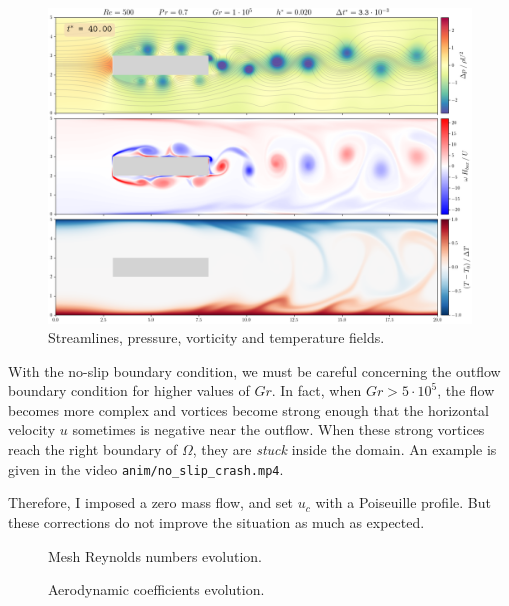 \documentclass[11 pt]{article}
\begin{document}
\begin{figure}[H]
    \centering
    \includegraphics[width=\textwidth]{../figures/frame_00400_no_slip.png}
    \caption{Streamlines, pressure, vorticity and temperature fields.}
    \label{fig:simu_no_slip}
\end{figure}

With the no-slip boundary condition, we must be careful concerning the outflow boundary condition for higher values of $Gr$. In fact, when $Gr > 5 \cdot 10^{5}$, the flow becomes more complex and vortices become strong enough that the horizontal velocity $u$ sometimes is negative near the outflow. When these strong vortices reach the right boundary of $\Omega$, they are \textit{stuck} inside the domain. An example is given in the video \texttt{anim/no\_slip\_crash.mp4}.

Therefore, I imposed a zero mass flow, and set $u_c$ with a Poiseuille profile. But these corrections do not improve the situation as much as expected.

\begin{figure}[H]
    \centering
    
    \caption{Mesh Reynolds numbers evolution.}
    \label{fig:mesh_re_no_slip}
\end{figure}

\begin{figure}[H]
    \centering
    
    \caption{Aerodynamic coefficients evolution.}
    \label{fig:drag_no_slip}
\end{figure}
\end{document}
